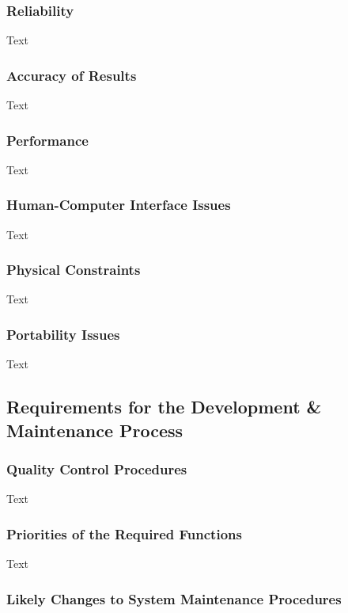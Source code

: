 \documentclass[12pt]{article}
\begin{document}
\subsubsection {Reliability}

Text

\subsubsection {Accuracy of Results}

Text

\subsubsection {Performance}

Text

\subsubsection {Human-Computer Interface Issues}

Text

\subsubsection {Physical Constraints}

Text

\subsubsection {Portability Issues}

Text

\subsection{Requirements for the Development & Maintenance Process}

\subsubsection {Quality Control Procedures}

Text

\subsubsection {Priorities of the Required Functions}

Text

\subsubsection {Likely Changes to System Maintenance Procedures}
\end{document}
